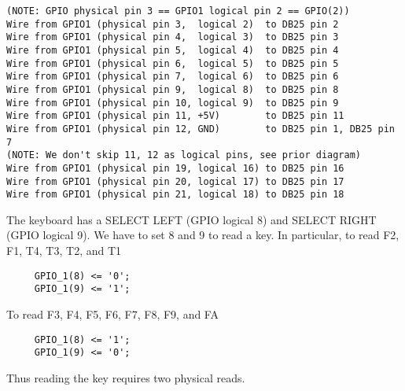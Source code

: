 \documentclass[dvipdfm]{book}
\begin{document}
\begin{verbatim}
(NOTE: GPIO physical pin 3 == GPIO1 logical pin 2 == GPIO(2))
Wire from GPIO1 (physical pin 3,  logical 2)  to DB25 pin 2
Wire from GPIO1 (physical pin 4,  logical 3)  to DB25 pin 3
Wire from GPIO1 (physical pin 5,  logical 4)  to DB25 pin 4
Wire from GPIO1 (physical pin 6,  logical 5)  to DB25 pin 5
Wire from GPIO1 (physical pin 7,  logical 6)  to DB25 pin 6
Wire from GPIO1 (physical pin 9,  logical 8)  to DB25 pin 8
Wire from GPIO1 (physical pin 10, logical 9)  to DB25 pin 9
Wire from GPIO1 (physical pin 11, +5V)        to DB25 pin 11
Wire from GPIO1 (physical pin 12, GND)        to DB25 pin 1, DB25 pin 7
(NOTE: We don't skip 11, 12 as logical pins, see prior diagram)
Wire from GPIO1 (physical pin 19, logical 16) to DB25 pin 16
Wire from GPIO1 (physical pin 20, logical 17) to DB25 pin 17
Wire from GPIO1 (physical pin 21, logical 18) to DB25 pin 18

\end{verbatim}

The keyboard has a SELECT LEFT (GPIO logical 8) and SELECT RIGHT
(GPIO logical 9). We have to set 8 and 9 to read a key. In particular,
to read F2, F1, T4, T3, T2, and T1
\begin{verbatim}
     GPIO_1(8) <= '0'; 
     GPIO_1(9) <= '1';
\end{verbatim}
To read F3, F4, F5, F6, F7, F8, F9, and FA
\begin{verbatim}
     GPIO_1(8) <= '1';
     GPIO_1(9) <= '0';
\end{verbatim}
Thus reading the key requires two physical reads.
\end{document}
